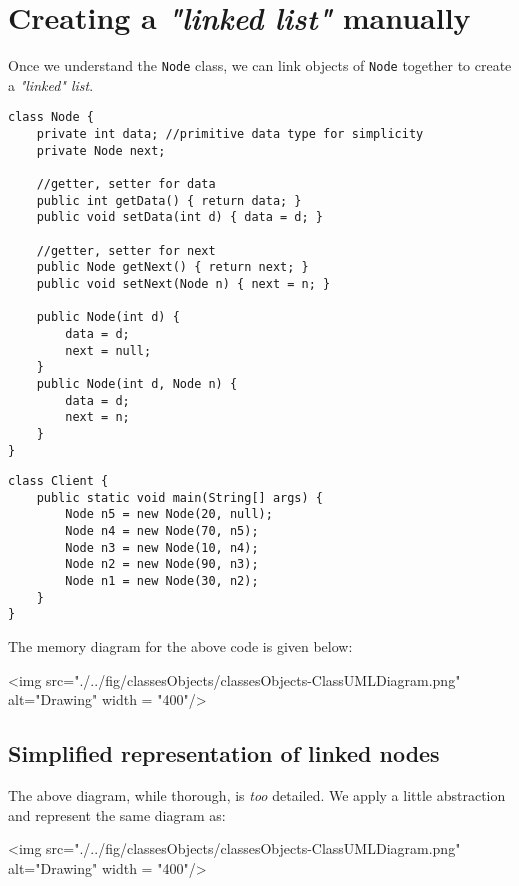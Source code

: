 \section{Creating a \emph{"linked list"} manually}

Once we understand the \texttt{Node} class, we can link objects of \texttt{Node} together to create a \textit{"linked" list}.

\begin{lstlisting}
class Node {
	private int data; //primitive data type for simplicity
	private Node next;
	
	//getter, setter for data
	public int getData() { return data; }	
	public void setData(int d) { data = d; }
	
	//getter, setter for next
	public Node getNext() {	return next; }
	public void setNext(Node n) { next = n; }
	
	public Node(int d) { 
		data = d; 
		next = null; 
	}
	public Node(int d, Node n) { 
		data = d; 
		next = n; 
	}
}
\end{lstlisting}

\newpage

\begin{lstlisting}
class Client {
	public static void main(String[] args) {
		Node n5 = new Node(20, null);
		Node n4 = new Node(70, n5);
		Node n3 = new Node(10, n4);
		Node n2 = new Node(90, n3);
		Node n1 = new Node(30, n2);
	}
}
\end{lstlisting}

The memory diagram for the above code is given below:

\vskip 0.5cm

\begin{center}
<img src="./../fig/classesObjects/classesObjects-ClassUMLDiagram.png" alt="Drawing" width = "400"/>
\end{center}

\subsection{Simplified representation of linked nodes}

The above diagram, while thorough, is \emph{too} detailed. We apply a little abstraction and represent the same diagram as:

\begin{center}
<img src="./../fig/classesObjects/classesObjects-ClassUMLDiagram.png" alt="Drawing" width = "400"/>
\end{center}

